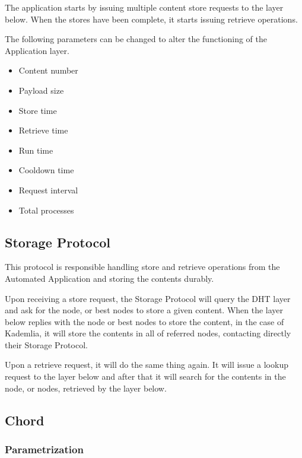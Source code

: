 \documentclass[sigconf]{acmart}
\begin{document}
The application starts by issuing multiple content store requests to the layer below. When the stores have been complete, it starts issuing retrieve operations.

The following parameters can be changed to alter the functioning of the Application layer.

\begin{multicols}{2}
\begin{itemize}
    \item Content number
    \item Payload size
    \item Store time
    \item Retrieve time
    \item Run time
    \item Cooldown time
    \item Request interval
    \item Total processes
\end{itemize}
\end{multicols}

\subsection{Storage Protocol}
This protocol is responsible handling store and retrieve operations from the Automated Application and storing the contents durably.

Upon receiving a store request, the Storage Protocol will query the DHT layer and ask for the node, or best nodes to store a given content. When the layer below replies with the node or best nodes to store the content, in the case of Kademlia, it will store the contents in all of referred nodes, contacting directly their Storage Protocol.

Upon a retrieve request, it will do the same thing again. It will issue a lookup request to the layer below and after that it will search for the contents in the node, or nodes, retrieved by the layer below.

\subsection{Chord}

\subsubsection{Parametrization}
\end{document}
